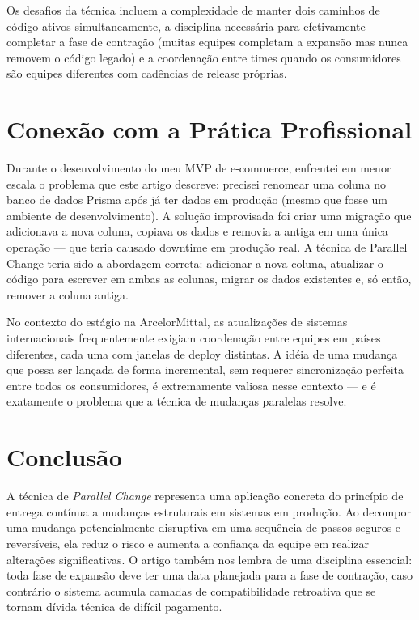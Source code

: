 \documentclass[12pt,a4paper]{article}
\begin{document}
Os desafios da t\'ecnica incluem a complexidade de manter dois caminhos de c\'odigo
ativos simultaneamente, a disciplina necess\'aria para efetivamente completar a
fase de contra\c{c}\~ao (muitas equipes completam a expans\~ao mas nunca removem
o c\'odigo legado) e a coordena\c{c}\~ao entre times quando os consumidores s\~ao
equipes diferentes com cadências de release pr\'oprias.

\section{Conex\~ao com a Pr\'atica Profissional}

Durante o desenvolvimento do meu MVP de e-commerce, enfrentei em menor escala o
problema que este artigo descreve: precisei renomear uma coluna no banco de dados
Prisma ap\'os j\'a ter dados em produ\c{c}\~ao (mesmo que fosse um ambiente de
desenvolvimento). A solu\c{c}\~ao improvisada foi criar uma migra\c{c}\~ao que
adicionava a nova coluna, copiava os dados e removia a antiga em uma \'unica
opera\c{c}\~ao --- que teria causado downtime em produ\c{c}\~ao real. A t\'ecnica
de Parallel Change teria sido a abordagem correta: adicionar a nova coluna,
atualizar o c\'odigo para escrever em ambas as colunas, migrar os dados existentes
e, s\'o ent\~ao, remover a coluna antiga.

No contexto do est\'agio na ArcelorMittal, as atualiza\c{c}\~oes de sistemas
internacionais frequentemente exigiam coordena\c{c}\~ao entre equipes em pa\'ises
diferentes, cada uma com janelas de deploy distintas. A id\'eia de uma mudan\c{c}a
que possa ser lan\c{c}ada de forma incremental, sem requerer sincroniza\c{c}\~ao
perfeita entre todos os consumidores, \'e extremamente valiosa nesse contexto ---
e \'e exatamente o problema que a t\'ecnica de mudan\c{c}as paralelas resolve.

\section{Conclus\~ao}

A t\'ecnica de \textit{Parallel Change} representa uma aplica\c{c}\~ao concreta
do princ\'ipio de entrega cont\'inua a mudan\c{c}as estruturais em sistemas em
produ\c{c}\~ao. Ao decompor uma mudan\c{c}a potencialmente disruptiva em uma
sequ\^encia de passos seguros e revers\'iveis, ela reduz o risco e aumenta a
confian\c{c}a da equipe em realizar altera\c{c}\~oes significativas. O artigo
tamb\'em nos lembra de uma disciplina essencial: toda fase de expans\~ao deve ter
uma data planejada para a fase de contra\c{c}\~ao, caso contr\'ario o sistema
acumula camadas de compatibilidade retroativa que se tornam d\'ivida t\'ecnica de
dif\'icil pagamento.
\end{document}
